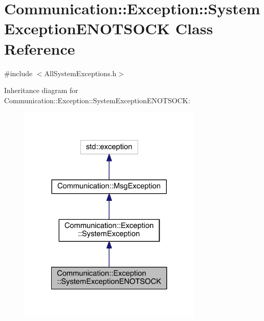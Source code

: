 \hypertarget{class_communication_1_1_exception_1_1_system_exception_e_n_o_t_s_o_c_k}{}\section{Communication\+:\+:Exception\+:\+:System\+Exception\+E\+N\+O\+T\+S\+O\+C\+K Class Reference}
\label{class_communication_1_1_exception_1_1_system_exception_e_n_o_t_s_o_c_k}


{\ttfamily \#include $<$All\+System\+Exceptions.\+h$>$}



Inheritance diagram for Communication\+:\+:Exception\+:\+:System\+Exception\+E\+N\+O\+T\+S\+O\+C\+K\+:\nopagebreak
\begin{figure}[H]
\begin{center}
\leavevmode
\includegraphics[width=248pt]{class_communication_1_1_exception_1_1_system_exception_e_n_o_t_s_o_c_k__inherit__graph}
\end{center}
\end{figure}


